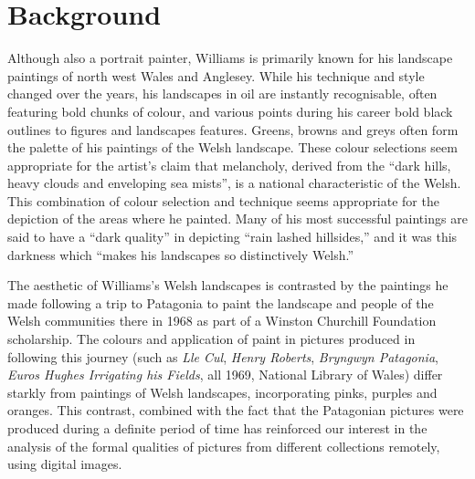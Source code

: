 \documentclass[conference,a4paper]{IEEEtran}
\begin{document}
\section{Background}

Although also a portrait painter, Williams is primarily known for his landscape
paintings of north west Wales and Anglesey. While his technique and style
changed over the years, his landscapes in oil are instantly recognisable, often
featuring bold chunks of colour, and various points during his career bold
black outlines to figures and landscapes features. Greens, browns and greys
often form the palette of his paintings of the Welsh landscape. These colour
selections seem appropriate for the artist’s claim that melancholy, derived
from the ``dark hills, heavy clouds and enveloping sea mists'', is a national
characteristic of the Welsh.\cite{Williams1993Across} This combination of
colour selection and technique seems appropriate for the depiction of the areas
where he painted. Many of his most successful paintings are said to have a
``dark quality'' in depicting ``rain lashed hillsides,'' and it was this
darkness which ``makes his landscapes so distinctively
Welsh.''\cite{Davies2004100} 


The aesthetic of Williams’s Welsh landscapes is contrasted by the paintings he
made following a trip to Patagonia to paint the landscape and people of the
Welsh communities there in 1968 as part of a Winston Churchill Foundation
scholarship. The colours and application of paint in pictures produced in
following this journey (such as \emph{Lle Cul}, \emph{Henry Roberts},
\emph{Bryngwyn Patagonia}, \emph{Euros Hughes Irrigating his Fields}, all 1969,
National Library of Wales) differ starkly from paintings of Welsh landscapes,
incorporating pinks, purples and oranges. This contrast, combined with the fact
that the Patagonian pictures were produced during a definite period of time has
reinforced our interest in the analysis of the formal qualities of pictures
from different collections remotely, using digital images. 
\end{document}
